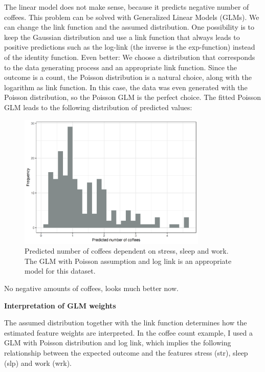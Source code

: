 \documentclass[
  11pt,
]{scrbook}
\begin{document}
The linear model does not make sense, because it predicts negative number of coffees.
This problem can be solved with Generalized Linear Models (GLMs).
We can change the link function and the assumed distribution.
One possibility is to keep the Gaussian distribution and use a link function that always leads to positive predictions such as the log-link (the inverse is the exp-function) instead of the identity function.
Even better:
We choose a distribution that corresponds to the data generating process and an appropriate link function.
Since the outcome is a count, the Poisson distribution is a natural choice, along with the logarithm as link function.
In this case, the data was even generated with the Poisson distribution, so the Poisson GLM is the perfect choice.
The fitted Poisson GLM leads to the following distribution of predicted values:

\begin{figure}

{\centering \includegraphics[width=0.8\textwidth]{images/linear-model-positive-1} 

}

\caption{Predicted number of coffees dependent on stress, sleep and work. The GLM with Poisson assumption and log link is an appropriate model for this dataset.}\label{fig:linear-model-positive}
\end{figure}

No negative amounts of coffees, looks much better now.

\textbf{Interpretation of GLM weights}

The assumed distribution together with the link function determines how the estimated feature weights are interpreted.
In the coffee count example, I used a GLM with Poisson distribution and log link, which implies the following relationship between the expected outcome and the features stress (str), sleep (slp) and work (wrk).
\end{document}

